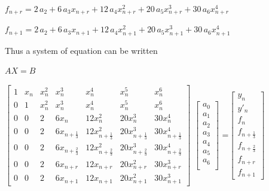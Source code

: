 \documentclass[12pt]{report}
\begin{document}
\vspace{10pt}
$f_{n+r} = 2\,a_{{2}}+6\,a_{{3}} x_{n+r}+12\,a_{{4}} {x^{2}_{n+r}}+20\,
a_{{5}} {x^{3}_{n+r}}+30\,a_{{6}} {x^{4}_{n+r}}$


\vspace{10pt}
$f_{n+1} = 2\,a_{{2}}+6\,a_{{3}} x_{n+1}+12\,a_{{4}} {x^{2}_{n+1}}+20\,
a_{{5}} {x^{3}_{n+1}}+30\,a_{{6}} {x^{4}_{n+1}}$


\noindent Thus a system of equation can be written

\begin{center}
	$AX = B$
\end{center}



\vspace{20pt}


$\begin{bmatrix}
1 & x_{n} & x^{2}_{n} &  x^{3}_{n} & x^{4}_{n}& x^{5}_{n}& x^{6}_{n}\\
0 & 1 & x^{2}_{n} &  x^{3}_{n} & x^{4}_{n} & x^{5}_{n} & x^{6}_{n}\\
0&0 & 2 & 6x_n &  12x^2_{n} & 20x^{3}_{n} & 30 x^{4}_{n}\\
0&0 & 2 & 6x_{n+\frac{1}{3}} &  12x^2_{n+\frac{1}{3}} & 20x^{3}_{n+\frac{1}{3}} & 30 x^{4}_{n+\frac{1}{3}}\\
0&0 & 2 & 6x_{n+\frac{2}{3}} &  12x^2_{n+\frac{2}{3}} & 20x^{3}_{n+\frac{2}{3}} & 30 x^{4}_{n+\frac{2}{3}}\\
0 & 0&2 & 6x_{n+r} &  12x_{n+r} & 20x^{2}_{n+r} & 30 x^{3}_{n+r}\\
0 & 0&2 & 6x_{n+1} &  12x_{n+1} & 20x^{2}_{n+1} & 30 x^{3}_{n+1}
\end{bmatrix}$
$\begin{bmatrix} a_{0}\\ a_{1} \\ a_{2} \\ a_{3}\\ a_{4}\\ a_{5}\\ a_{6}\\ \end{bmatrix}$
=$\begin{bmatrix} y_{n}\\ y'_{n} \\ f_{n}\\ f_{n+\frac{1}{3}}\\ f_{n+\frac{2}{3}}\\ f_{n+r} \\ f_{n+1}
\end{bmatrix}$\\
\end{document}
